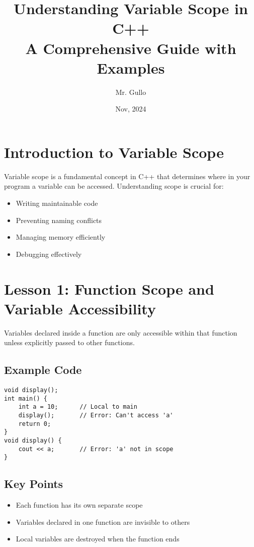 \documentclass{article}
\title{\Huge{\textbf{Understanding Variable Scope in C++}}\\
       \Large{A Comprehensive Guide with Examples}}
\author{Mr. Gullo}
\date{Nov, 2024}
\begin{document}
\maketitle
\tableofcontents
\newpage

\section{Introduction to Variable Scope}
Variable scope is a fundamental concept in C++ that determines where in your program a variable can be accessed. Understanding scope is crucial for:
\begin{itemize}
    \item Writing maintainable code
    \item Preventing naming conflicts
    \item Managing memory efficiently
    \item Debugging effectively
\end{itemize}

\section{Lesson 1: Function Scope and Variable Accessibility}

\begin{conceptbox}
Variables declared inside a function are only accessible within that function unless explicitly passed to other functions.
\end{conceptbox}

\subsection{Example Code}
\begin{lstlisting}
void display();
int main() {
    int a = 10;      // Local to main
    display();       // Error: Can't access 'a'
    return 0;
}
void display() {
    cout << a;       // Error: 'a' not in scope
}
\end{lstlisting}

\subsection{Key Points}
\begin{itemize}
    \item Each function has its own separate scope
    \item Variables declared in one function are invisible to others
    \item Local variables are destroyed when the function ends
\end{itemize}
\end{document}
